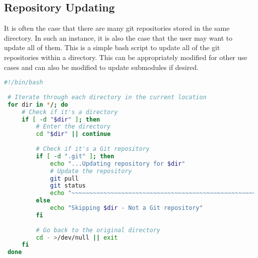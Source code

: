  \subsection{Repository Updating}
 
 It is often the case that there are many git repositories stored in the same directory. In such an instance, it is also the case that the user may want to update all of them. This is a simple bash script to update all of the git repositories within a directory. This can be appropriately modified for other use cases and can also be modified to update submodules if desired.
 
 \begin{lstlisting}[language=Bash, style=shellstyle]
 #!/bin/bash
 
 # Iterate through each directory in the current location
 for dir in */; do
     # Check if it's a directory
     if [ -d "$dir" ]; then
         # Enter the directory
         cd "$dir" || continue
         
         # Check if it's a Git repository
         if [ -d ".git" ]; then
             echo "...Updating repository for $dir"
             # Update the repository
             git pull
             git status
             echo "~~~~~~~~~~~~~~~~~~~~~~~~~~~~~~~~~~~~~~~~~~~~~~~~~~~~~~"
         else
             echo "Skipping $dir - Not a Git repository"
         fi
 
         # Go back to the original directory
         cd - >/dev/null || exit
     fi
 done
 \end{lstlisting}
 
 